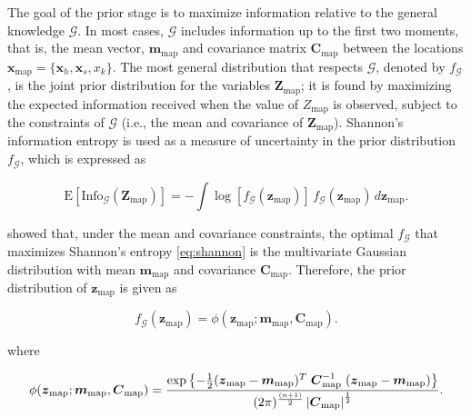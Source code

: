 The goal of the prior stage is to maximize information relative to the general knowledge \(\mathcal{G}\). In most cases, \(\mathcal{G}\) includes information up to the first two moments, that is, the mean vector, \(\boldsymbol{m}_\mathrm{map}\) and covariance matrix \(\boldsymbol{C}_\mathrm{map}\) between the locations \(\boldsymbol{x}_\mathrm{map} = \{\boldsymbol{x}_h, \boldsymbol{x}_s, x_k\}\). The most general distribution that respects \(\mathcal{G}\), denoted by \(f_\mathcal{G}\), is the joint prior distribution for the variables \(\boldsymbol{Z}_\mathrm{map}\); it is found by maximizing the expected information received when the value of \(Z_\mathrm{map}\) is observed, subject to the constraints of \(\mathcal{G}\) (i.e., the mean and covariance of \(\boldsymbol{Z}_\mathrm{map}\)). Shannon's information entropy is used as a measure of uncertainty in the prior distribution \(f_{\mathcal{G}}\), which is expressed as

\begin{equation}
\mathrm{E}\left[\mathrm{Info}_\mathcal{G}(\boldsymbol{Z}_{\mathrm{map}})\right] = - \int \log\left[{f_\mathcal{G} (\boldsymbol{z}_{\mathrm{map}})}\right] \, f_\mathcal{G} (\boldsymbol{z}_{\mathrm{map}})  \, d \boldsymbol{z}_{\mathrm{map}}
\label{eq:shannon}.
\end{equation}

\citet{christakos1998environmental} showed that, under the mean and covariance constraints, the optimal \(f_\mathcal{G}\) that maximizes Shannon's entropy \eqref{eq:shannon} is the multivariate Gaussian distribution with mean \(\boldsymbol{m}_\mathrm{map}\) and covariance \(\boldsymbol{C}_\mathrm{map}\). Therefore, the prior distribution of \(\boldsymbol{z}_\mathrm{map}\) is given as

\begin{equation}
f_\mathcal{G} (\boldsymbol{z}_\mathrm{map}) = 
  \phi (\boldsymbol{z}_\mathrm{map}; \boldsymbol{m}_\mathrm{map}, \boldsymbol{C}_\mathrm{map})
\label{eq:prior-pdf}.
\end{equation}

where

\begin{equation}
\phi (\boldsymbol{z}_\mathrm{map}; \boldsymbol{m}_\mathrm{map}, \boldsymbol{C}_\mathrm{map}) = \dfrac{\exp\left\{ -\frac{1}{2} (\boldsymbol{z}_\mathrm{map} - \boldsymbol{m}_\mathrm{map})^T \hspace{.3em} \boldsymbol{C}_\mathrm{map}^{-1} \hspace{.3em} (\boldsymbol{z}_\mathrm{map} - \boldsymbol{m}_\mathrm{map})\right\}}{(2\pi)^{\frac{(n+1)}{2}} \, \rvert{\boldsymbol{C}_\mathrm{map}\lvert}^{\frac{1}{2}}}
\label{eq:prior-pdf-full}.
\end{equation}

